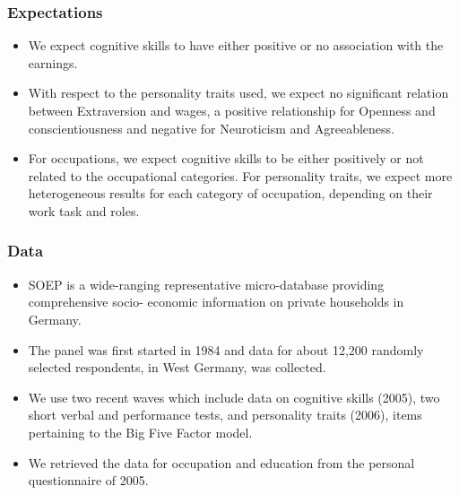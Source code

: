 \documentclass[11pt]{beamer}
\begin{document}
\begin{frame}[t]
     \note{~}
\end{frame}


\begin{frame}[t]
	\frametitle{Expectations}
	\begin{itemize}
		\item We expect cognitive skills to have either positive or no association
with the earnings.
		\item With respect to the personality traits used, we expect no significant
relation between Extraversion and wages, a positive relationship for
Openness and conscientiousness and negative for Neuroticism and
Agreeableness.

		\item For occupations, we expect cognitive skills to be either positively or
not related to the occupational categories. For personality traits, we
expect more heterogeneous results for each category of occupation,
depending on their work task and roles.
	 \end{itemize}
 	\note{~}
\end{frame}

\begin{frame}[t]
	\frametitle{Data}
         \begin{itemize}

 
		 \item SOEP is a wide-ranging representative micro-database providing
comprehensive socio- economic information on private households in
Germany.

		\item The panel was first started in 1984 and data for about 12,200
randomly selected respondents, in West Germany, was collected.

		\item We use two recent waves which include data on cognitive skills
(2005), two short verbal and performance tests, and personality traits
(2006), items pertaining to the Big Five Factor model.

		\item We retrieved the data for occupation and education from the
personal questionnaire of 2005.
	\end{itemize}
	\note{~}
\end{frame}
\end{document}
